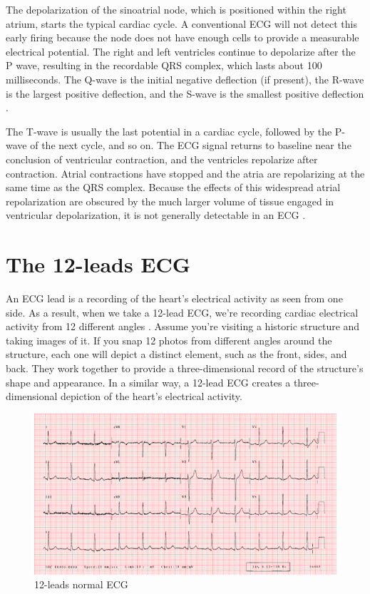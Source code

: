 The depolarization of the sinoatrial node, which is positioned within the right atrium, starts the typical cardiac cycle. A conventional ECG will not detect this early firing because the node does not have enough cells to provide a measurable electrical potential. The right and left ventricles continue to depolarize after the P wave, resulting in the recordable QRS complex, which lasts about 100 milliseconds. The Q-wave is the initial negative deflection (if present), the R-wave is the largest positive deflection, and the S-wave is the smallest positive deflection \cite{ecg3}.
 
 
 The T-wave is usually the last potential in a cardiac cycle, followed by the P-wave of the next cycle, and so on. The ECG signal returns to baseline near the conclusion of ventricular contraction, and the ventricles repolarize after contraction. Atrial contractions have stopped and the atria are repolarizing at the same time as the QRS complex. Because the effects of this widespread atrial repolarization are obscured by the much larger volume of tissue engaged in ventricular depolarization, it is not generally detectable in an ECG \cite{ecg1}. 
 
 
\section{The 12-leads ECG} \label{12_lead_ecg}

An ECG lead is a recording of the heart's electrical activity as seen from one side. As a result, when we take a 12-lead ECG, we're recording cardiac electrical activity from 12 different angles \cite{ecg3}. Assume you're visiting a historic structure and taking images of it. If you snap 12 photos from different angles around the structure, each one will depict a distinct element, such as the front, sides, and back. They work together to provide a three-dimensional record of the structure's shape and appearance. In a similar way, a 12-lead ECG creates a three-dimensional depiction of the heart's electrical activity.

\begin{figure}[H]
\centering
\includegraphics[scale=0.24]{img/normal_ecg.png}
\caption{12-leads normal ECG}
\label{fig:normal_ecg}
\end{figure}

